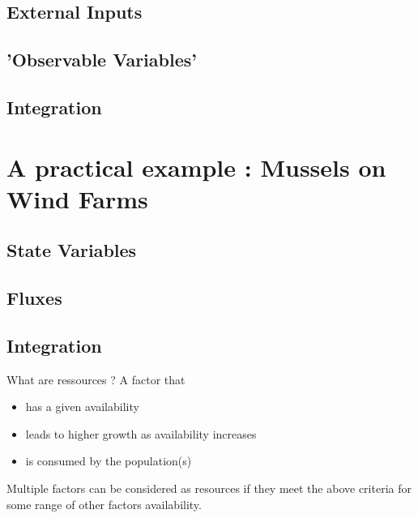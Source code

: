\documentclass[final,xcolor=dvipsnames]{beamer}
\begin{document}
\subsection{External Inputs}
\subsection{'Observable Variables'}
\subsection{Integration}



\section{A practical example : Mussels on Wind Farms}
\subsection{State Variables}

\subsection{Fluxes}

\subsection{Integration}


\begin{frame}{What are ressources ?}
 A factor that
 \begin{itemize}
 \item has a given availability
 \item leads to higher growth as availability increases
 \item is consumed by the population(s)
 \end{itemize}
 Multiple factors can be considered as resources if they meet the above criteria for some range of other factors availability.
\end{frame}
\end{document}
